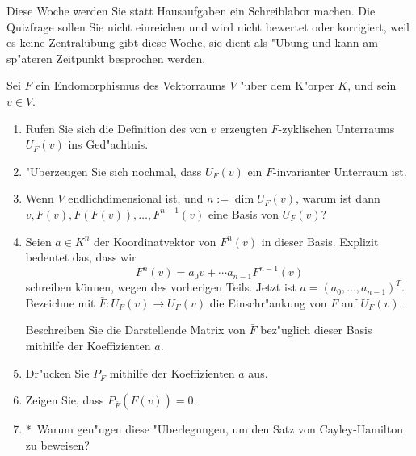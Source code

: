 \documentclass[a4,11pt]{article}
\begin{document}
\vspace*{-17mm}
{
\kopf
}


Diese Woche werden Sie statt Hausaufgaben ein Schreiblabor machen. Die Quizfrage sollen Sie nicht einreichen und wird nicht bewertet oder korrigiert, weil es keine Zentralübung gibt diese Woche, sie dient als "Ubung und kann am sp"ateren Zeitpunkt besprochen werden.

\bigskip

\begin{aufgabe}[Scheiblaboraufgabe]
Sei $F$ ein Endomorphismus des Vektorraums $V$ "uber dem K"orper $K$,
und sein $v \in V$.

\newcommand{\bonusitem}{\item\hspace*{-2.4mm}*\ }

  \begin{enumerate}
  \item Rufen Sie sich die Definition des von $v$ erzeugten
    $F$-zyklischen Unterraums $U_F(v)$ ins Ged"achtnis.
  \item "Uberzeugen Sie sich nochmal, dass $U_F(v)$ ein
    $F$-invarianter Unterraum ist.
  \item Wenn $V$ endlichdimensional ist, und $n := \dim U_F(v)$, warum
    ist dann \\ $v, F(v), F(F(v)), \ldots, F^{n-1}(v)$ eine
    Basis von $U_F(v)$?
  \item Seien $a \in K^n$ der Koordinatvektor von $F^n(v)$ in dieser Basis. Explizit bedeutet das, dass wir
  \[
  F^n(v) = a_0 v + \cdots a_{n-1} F^{n-1}(v) 
  \]
  schreiben können, wegen des vorherigen Teils. Jetzt ist $a = (a_0, \dots , a_{n-1})^T$.
    Bezeichne mit $\bar F \colon U_F(v) \to U_F(v)$ die 
    Einschr"ankung von $F$ auf $U_F(v)$.
    
    Beschreiben Sie die Darstellende Matrix von $\bar F$ bez"uglich
    dieser Basis mithilfe der Koeffizienten $a$.
  \item Dr"ucken Sie $P_{\bar F}$ mithilfe der Koeffizienten $a$ aus.
  \item Zeigen Sie, dass $P_{\bar F}(\bar F(v)) = 0$.
  \bonusitem Warum gen"ugen diese "Uberlegungen, um den Satz von
    Cayley-Hamilton zu beweisen?
\end{enumerate}

\end{aufgabe}
\end{document}
